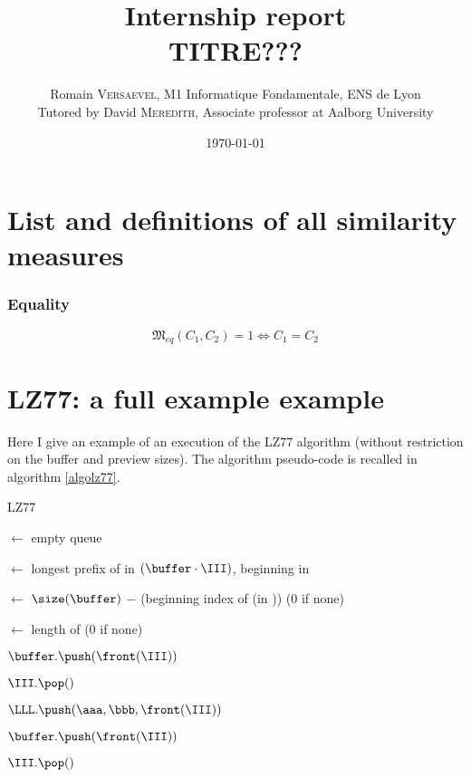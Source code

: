 \documentclass[a4paper,10pt]{article}
\title{ \Large Internship report \\ \LARGE TITRE???}
\author{\normalsize Romain \textsc{Versaevel}, M1 Informatique Fondamentale, ENS de Lyon \\ \normalsize Tutored by David \textsc{Meredith}, Associate professor at Aalborg University\\}
\date{\today}
\begin{document}

\tableofcontents
\newpage


\section{List and definitions of all similarity measures}

\subsubsection*{Equality}

\begin{equation}
\mathfrak{M}_{eq}(C_1,C_2) = 1 \Leftrightarrow C_1 = C_2
\end{equation}



\section{LZ77: a full example example}

Here I give an example of an execution of the LZ77 algorithm (without restriction on the buffer and preview sizes). The algorithm pseudo-code is recalled in algorithm \ref{algolz77}.

\begin{algorithm}
\caption{LZ77 \label{algolz77}}
       
   


\Debut
{
	\buffer $\leftarrow$ empty queue 

	{
		\pref $\leftarrow$ longest prefix of \III in $(\buffer\cdot\III)$, beginning in \buffer

		\aaa $\leftarrow$ $\size(\buffer)$ $-$ (beginning index of \pref (in \buffer)) ($0$ if none)

		\bbb $\leftarrow$ length of \pref ($0$ if none)

		{
			$\buffer.\push(\front(\III))$

			$\III.\pop()$
		}
		$\LLL.\push(\aaa,\bbb,\front(\III))$

		$\buffer.\push(\front(\III))$

		$\III.\pop()$
	}
	\Retour \LLL
}
\end{algorithm}
\end{document}
